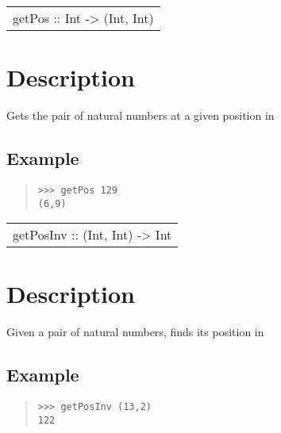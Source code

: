 \begin{haddockdesc}
\item[\begin{tabular}{@{}l}
getPos :: Int -> (Int, Int)
\end{tabular}]
{\haddockbegindoc
\section*{Description}
Gets the pair of natural numbers at a given position in \par
\subsection*{Example}
\begin{quote}
{\haddockverb\begin{verbatim}
>>> getPos 129
(6,9)

\end{verbatim}}
\end{quote}}
\end{haddockdesc}
\begin{haddockdesc}
\item[\begin{tabular}{@{}l}
getPosInv :: (Int, Int) -> Int
\end{tabular}]
{\haddockbegindoc
\section*{Description}
Given a pair of natural numbers, finds its position in \par
\subsection*{Example}
\begin{quote}
{\haddockverb\begin{verbatim}
>>> getPosInv (13,2)
122

\end{verbatim}}
\end{quote}}
\end{haddockdesc}
